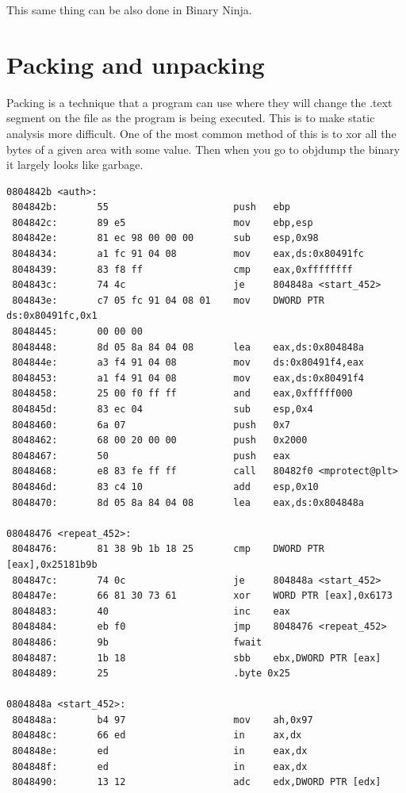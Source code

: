 \documentclass{report}
\begin{document}
This same thing can be also done in Binary Ninja.


\section{Packing and unpacking}
Packing is a technique that a program can use where they will change the .text segment on the file as the program is being executed.  This is to make static analysis more difficult.  One of the most common method of this is to xor all the bytes of a given area with some value.  Then when you go to objdump the binary it largely looks like garbage.  

\begin{lstlisting}
0804842b <auth>:
 804842b:       55                      push   ebp
 804842c:       89 e5                   mov    ebp,esp
 804842e:       81 ec 98 00 00 00       sub    esp,0x98
 8048434:       a1 fc 91 04 08          mov    eax,ds:0x80491fc
 8048439:       83 f8 ff                cmp    eax,0xffffffff
 804843c:       74 4c                   je     804848a <start_452>
 804843e:       c7 05 fc 91 04 08 01    mov    DWORD PTR ds:0x80491fc,0x1
 8048445:       00 00 00 
 8048448:       8d 05 8a 84 04 08       lea    eax,ds:0x804848a
 804844e:       a3 f4 91 04 08          mov    ds:0x80491f4,eax
 8048453:       a1 f4 91 04 08          mov    eax,ds:0x80491f4
 8048458:       25 00 f0 ff ff          and    eax,0xfffff000
 804845d:       83 ec 04                sub    esp,0x4
 8048460:       6a 07                   push   0x7
 8048462:       68 00 20 00 00          push   0x2000
 8048467:       50                      push   eax
 8048468:       e8 83 fe ff ff          call   80482f0 <mprotect@plt>
 804846d:       83 c4 10                add    esp,0x10
 8048470:       8d 05 8a 84 04 08       lea    eax,ds:0x804848a

08048476 <repeat_452>:
 8048476:       81 38 9b 1b 18 25       cmp    DWORD PTR [eax],0x25181b9b
 804847c:       74 0c                   je     804848a <start_452>
 804847e:       66 81 30 73 61          xor    WORD PTR [eax],0x6173
 8048483:       40                      inc    eax
 8048484:       eb f0                   jmp    8048476 <repeat_452>
 8048486:       9b                      fwait
 8048487:       1b 18                   sbb    ebx,DWORD PTR [eax]
 8048489:       25                      .byte 0x25

0804848a <start_452>:
 804848a:       b4 97                   mov    ah,0x97
 804848c:       66 ed                   in     ax,dx
 804848e:       ed                      in     eax,dx
 804848f:       ed                      in     eax,dx
 8048490:       13 12                   adc    edx,DWORD PTR [edx]
\end{lstlisting}
\end{document}
